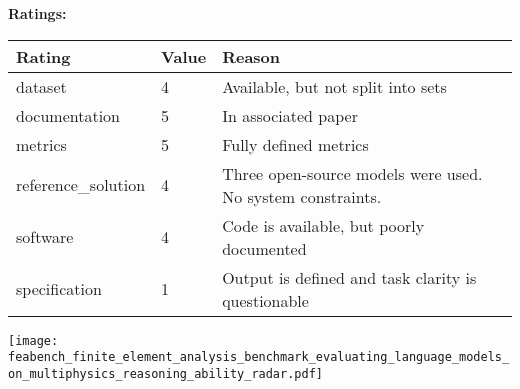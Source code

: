 {{{\bf Ratings:} ~ \\

\begin{tabular}{p{} p{} p{}}
\hline
Rating & Value & Reason \\
\hline
dataset & 4 & Available, but not split into sets
 \\
documentation & 5 & In associated paper
 \\
metrics & 5 & Fully defined metrics
 \\
reference\_solution & 4 & Three open-source models were used. No system constraints.
 \\
software & 4 & Code is available, but poorly documented
 \\
specification & 1 & Output is defined and task clarity is questionable
 \\
\hline
\end{tabular}

\texttt{[image: feabench\_finite\_element\_analysis\_benchmark\_evaluating\_language\_models\_on\_multiphysics\_reasoning\_ability\_radar.pdf]}
}}
\clearpage